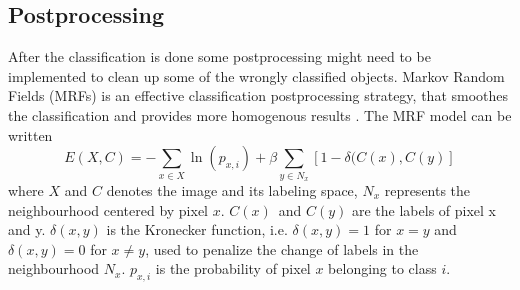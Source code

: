 \documentclass{article}
\begin{document}
\subsection{Postprocessing}

After the classification is done some postprocessing might need to be implemented to clean up some of the wrongly classified objects. Markov Random Fields (MRFs) is an effective classification postprocessing strategy, that smoothes the classification and provides more homogenous results \citep{mrf}. The MRF model can be written 
\begin{equation*}
E(X,C) = -\sum_{x\in X}\ln(p_{x,i}) + \beta\sum_{y\in N_{x}}[1 - \delta(C(x), C(y)]
\end{equation*}
where $X$ and $C$ denotes the image and its labeling space, $N_{x}$ represents the neighbourhood centered by pixel $x$. $C(x)$ and $C(y)$ are the labels of pixel x and y. $\delta(x,y)$ is the Kronecker function, i.e. $\delta(x,y) = 1$ for $x = y$ and $\delta(x,y) = 0$ for $x \neq y$, used to penalize the change of labels in the neighbourhood $N_{x}$. $p_{x,i}$ is the probability of pixel $x$ belonging to class $i$.
\end{document}
